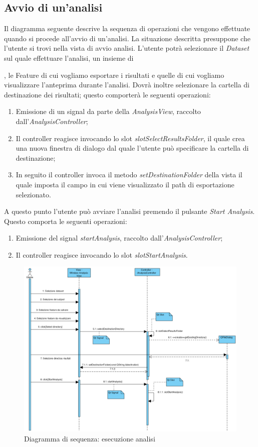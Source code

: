 \subsection{Avvio di un'analisi}
\label{avvio_analisi}
Il diagramma seguente descrive la sequenza di operazioni che vengono effettuate quando si procede all'avvio di un'analisi.
La situazione descritta presuppone che l'utente si trovi nella vista di avvio analisi. L'utente potrà selezionare il \textit{Dataset} sul quale effettuare l'analisi, un insieme di \subject{}, le Feature\g{} di cui vogliamo esportare i risultati e quelle di cui vogliamo visualizzare l'anteprima durante l'analisi.
Dovrà inoltre selezionare la cartella di destinazione dei risultati; questo comporterà le seguenti operazioni:
\begin{enumerate}
	\item Emissione di un signal\g{} da parte della \textit{AnalysisView}, raccolto dall'\textit{AnalysisController};
	\item Il controller reagisce invocando lo slot\g{} \textit{slotSelectResultsFolder}, il quale crea una nuova finestra di dialogo dal quale l'utente può specificare la cartella di destinazione;
	\item In seguito il controller invoca il metodo \textit{setDestinationFolder} della vista il quale imposta il campo in cui viene visualizzato il path di esportazione selezionato.
\end{enumerate}
A questo punto l'utente può avviare l'analisi premendo il pulsante \textit{Start Analysis}. Questo comporta le seguenti operazioni:
\begin{enumerate}
	\item Emissione del signal \textit{startAnalysis}, raccolto dall'\textit{AnalysisController};
	\item Il controller reagisce invocando lo slot\g{} \textit{slotStartAnalysis}.
\end{enumerate}

\begin{figure}[!h]
\centering
	\includegraphics[width=\linewidth]{./Content/Immagini/esegui_analisi.png}
	\caption{Diagramma di sequenza: esecuzione analisi}
	\label{esegui_analisi_img}
\end{figure}
\pagebreak

